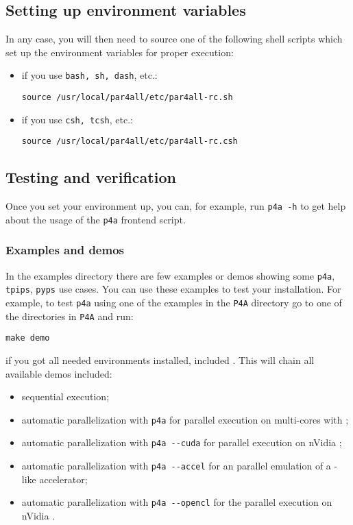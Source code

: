 \documentclass[a4paper]{article}
\begin{document}
\subsection{Setting up environment variables}
In any case, you will then need to source one of the following shell
scripts which set up the environment variables for proper \Apfa
execution:
\begin{itemize}
\item if you use \texttt{bash, sh, dash}, etc.:
\begin{verbatim}
source /usr/local/par4all/etc/par4all-rc.sh
\end{verbatim}
\item if you use \texttt{csh, tcsh}, etc.:
\begin{verbatim}
source /usr/local/par4all/etc/par4all-rc.csh
\end{verbatim}
\end{itemize}


\subsection{Testing and verification}

Once you set your environment up, you can, for example, run \texttt{p4a -h}
to get help about the usage of the \texttt{p4a} frontend script.


\subsubsection{Examples and demos}

In the examples directory there are few examples or demos showing some
\texttt{p4a}, \texttt{tpips}, \texttt{pyps} use cases. You can use these
examples to test your installation.  For example, to test \texttt{p4a}
using one of the examples in the \texttt{P4A} directory go to one of the
directories in \texttt{P4A} and run:
\begin{verbatim}
make demo
\end{verbatim}
if you got all needed environments installed, included \Acuda. This will
chain all available demos included:
\begin{itemize}
\item sequential execution;
\item automatic parallelization with \texttt{p4a} for parallel execution
  on multi-cores with \Aopenmp;
\item automatic parallelization with \verb|p4a --cuda| for parallel
  execution on nVidia \Agpu;
\item automatic parallelization with \verb|p4a --accel| for an \Aopenmp
  parallel emulation of a \Agpu-like accelerator;
\item automatic parallelization with \verb|p4a --opencl| for the \Aopencl
  parallel execution on nVidia \Agpu.
\end{itemize}
\end{document}
